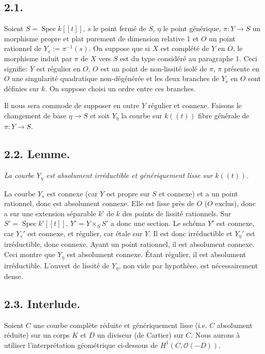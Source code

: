 \documentclass[11pt]{article}
\DeclareMathOperator{\Spec}{Spec}
\newcommand{\OO}{\mathcal O}
\begin{document}
\subsection*{2.1.}
Soient $S=\Spec k[[t]]$, $s$ le point fermé de $S$, $\eta$ le point générique, $\pi:Y\to S$ un morphisme propre et plat purement de dimension relative 1 et $O$ un point rationnel de $Y_s:=\pi^{-1}(s)$. On suppose que si $X$ est complété de $Y$ en $O$, le morphisme induit par $\pi$ de $X$ vers $S$ est du type considéré au paragraphe 1. Ceci signifie: $Y$ est régulier en $O$, $O$ est un point de non-lissité isolé de $\pi$, $\pi$ présente en $O$ une singularité quadratique non-dégénérée et les deux branches de $Y_s$ en $O$ sont définies sur $k$. On suppose choisi un ordre entre ces branches.

Il nous sera commode de supposer en outre $Y$ régulier et connexe. Faisons le changement de base $\eta\to S$ et soit $Y_\eta$ la courbe sur $k((t))$ fibre générale de $\pi:Y\to S$.

\subsection*{2.2. Lemme.}
\emph{La courbe $Y_\eta$ est absolument irréductible et génériquement lisse sur $k((t))$.}

La courbe $Y_s$ est connexe (car $Y$ est propre sur $S$ et connexe) et a un point rationnel, donc est absolument connexe. Elle est lisse près de $O$ ($O$ exclus), donc a sur une extension séparable $k'$ de $k$ des points de lissité rationnels. Sur $S'=\Spec k'[[t]]$, $Y'=Y\times_SS'$ a donc une section. Le schéma $Y'$ est connexe, car $Y_s'$ est connexe, et régulier, car étale sur $Y$. Il est donc irréductible et $Y_\eta'$ est irréductible, donc connexe. Ayant un point rationnel, il est absolument connexe. Ceci montre que $Y_\eta$ est absolument connexe. Étant régulier, il est absolument irréductible. L'ouvert de lissité de $Y_\eta$, non vide par hypothèse, est nécessairement dense.

\subsection*{2.3. Interlude.}
Soient $C$ une courbe complète réduite et génériquement lisse (i.e. $C$ absolument réduite) sur un corps $K$ et $D$ un diviseur (de Cartier) sur $C$. Nous aurons à utiliser l'interprétation géométrique ci-dessous de $H^1(C,\OO(-D))$.
\end{document}
